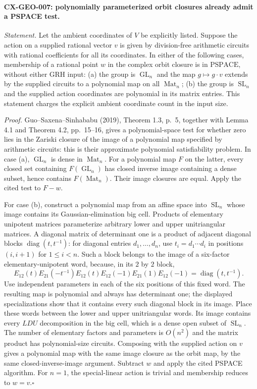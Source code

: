 \documentclass[11pt,a4paper]{article}
\begin{document}
\paragraph{CX-GEO-007: polynomially parameterized orbit closures already admit a PSPACE test.}
\emph{Statement.} Let the ambient coordinates of $V$ be explicitly listed.
Suppose the action on a supplied rational vector $v$ is given by
division-free arithmetic circuits with rational coefficients for all its
coordinates. In either of the following
cases, membership of a rational point $w$ in the complex orbit closure is
in $\mathrm{PSPACE}$, without either GRH input: (a) the group is
$\operatorname{GL}_n$ and the map $g\mapsto g\cdot v$ extends by the supplied
circuits to a polynomial map on all $\operatorname{Mat}_n$; (b) the group is
$\operatorname{SL}_n$ and the supplied action coordinates are polynomial
in its matrix entries. This statement charges the explicit ambient
coordinate count in the input size.

\emph{Proof.} Guo--Saxena--Sinhababu (2019), Theorem 1.3, p.~5, together
with Lemma 4.1 and Theorem 4.2, pp.~15--16, gives a polynomial-space test
for whether zero lies in the Zariski closure of the image of a polynomial
map specified by arithmetic circuits: this is their approximate polynomial
satisfiability problem. In case (a), $\operatorname{GL}_n$ is dense in
$\operatorname{Mat}_n$. For a polynomial map $F$ on the latter, every closed
set containing $F(\operatorname{GL}_n)$ has closed inverse image containing
a dense subset, hence contains $F(\operatorname{Mat}_n)$. Their image
closures are equal. Apply the cited test to $F-w$.

For case (b), construct a polynomial map from an affine space into
$\operatorname{SL}_n$ whose image contains its Gaussian-elimination big
cell. Products of elementary unipotent matrices parameterize arbitrary
lower and upper unitriangular matrices. A diagonal matrix of determinant
one is a product of adjacent diagonal blocks
$\operatorname{diag}(t,t^{-1})$: for diagonal entries $d_1,\ldots,d_n$,
use $t_i=d_1\cdots d_i$ in positions $(i,i+1)$ for $1\leq i<n$.
Such a block belongs to the image of a
six-factor elementary-unipotent word, because, in its $2$ by $2$ block,
\[
 E_{12}(t)E_{21}(-t^{-1})E_{12}(t)
 E_{12}(-1)E_{21}(1)E_{12}(-1)
       =\operatorname{diag}(t,t^{-1}).
\]
Use independent parameters in each of the six positions of this fixed
word. The resulting map is polynomial and always has determinant one;
the displayed specializations show that it contains every such diagonal
block in its image. Place these words between the lower and upper
unitriangular words. Its image contains every $LDU$ decomposition in the
big cell, which is a dense open subset of $\operatorname{SL}_n$.
The number of elementary factors and parameters is $O(n^2)$ and the
matrix product has polynomial-size circuits. Composing with the supplied
action on $v$ gives a polynomial map with the same image closure as the
orbit map, by the same closed-inverse-image argument. Subtract $w$ and
apply the cited PSPACE algorithm. For $n=1$, the special-linear action is
trivial and membership reduces to $w=v$.\hfill$\square$
\end{document}
